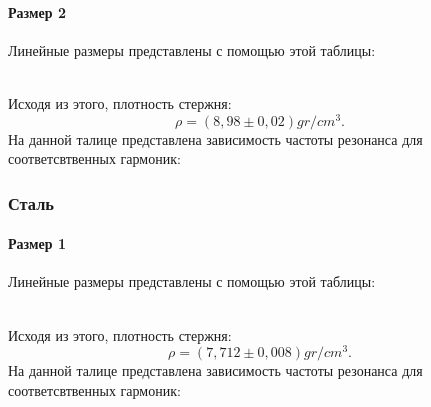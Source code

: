 \documentclass[a4paper, 12pt]{article}%
\begin{document}
\paragraph*{Размер 2}
Линейные размеры представлены с помощью этой таблицы:
\begin{table}[h]
\end{table}
\\Исходя из этого, плотность стержня:
\begin{equation}
\rho=(8,98\pm0,02)gr/cm^3.
\end{equation}
На данной талице представлена зависимость частоты резонанса для соответсвтвенных гармоник:
\begin{table}[h]
\end{table}
\subsubsection{Сталь}
\paragraph*{Размер 1}
Линейные размеры представлены с помощью этой таблицы:
\begin{table}[h]
\end{table}
\\Исходя из этого, плотность стержня:
\begin{equation}
\rho=(7,712\pm0,008)gr/cm^3.
\end{equation}
На данной талице представлена зависимость частоты резонанса для соответсвтвенных гармоник:
\begin{table}[h!]
\end{table}
\end{document}

